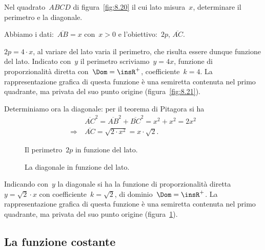 \begin{problema}
\label{ex:8.21}
Nel quadrato~$ABCD$ di figura~\ref{fig:8.20} il cui lato misura~$x$, determinare il perimetro e la diagonale.
\end{problema}
\begin{soluzione}
 Abbiamo i dati:~$\overline{AB}=x$ con~$x>0$ e l'obiettivo:~$2p$, $\overline{AC}$.

 $2p=4\cdot x$, al variare del lato varia il perimetro, che risulta essere dunque funzione del lato.
Indicato con~$y$ il perimetro scriviamo~$y=4x$, funzione di proporzionalità diretta con~$\Dom=\insR^{+}$,
coefficiente~$k=4$. La rappresentazione grafica di questa funzione è una semiretta contenuta nel primo quadrante,
ma privata del suo punto origine (figura~\ref{fig:8.21}).

Determiniamo ora la diagonale: per il teorema di Pitagora si ha
\begin{align*}
 &\overline{AC}^{2}=\overline{AB}^{2}+\overline{BC}^{2}=x^{2}+x^{2}=2x^{2}\\
 \Rightarrow\:&\overline{AC}=\sqrt{2\cdot x^{2}}=x\cdot \sqrt{2}.
\end{align*}

\begin{figure}[htb]
 \begin{minipage}[b]{.45\textwidth}
  \centering
  \caption{Il perimetro~$2p$ in funzione del lato.}\label{fig:8.21}
 \end{minipage}\hfil
 \begin{minipage}[b]{.45\textwidth}
  \centering
  \caption{La diagonale in funzione del lato.}\label{fig:8.22}
 \end{minipage}
\end{figure}

Indicando con~$y$ la diagonale si ha la funzione di proporzionalità diretta~$y=\sqrt{2}\cdot x$
con coefficiente~$k=\sqrt{2}$, di dominio~$\Dom=\insR^{+}$.
La rappresentazione grafica di questa funzione è una semiretta contenuta nel primo quadrante, ma privata del suo punto origine (figura~\ref{fig:8.22}).
\end{soluzione}

\vspazio\ovalbox{\risolvii \ref{ese:\thechapter.41}, \ref{ese:\thechapter.42}, \ref{ese:\thechapter.43}, \ref{ese:\thechapter.44}, \ref{ese:\thechapter.45}}
\pagebreak
\subsection{La funzione costante}

